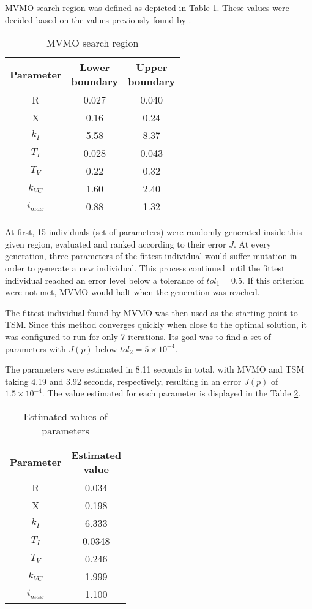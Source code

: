 MVMO search region was defined as depicted in Table \ref{tab: MVMO_boundaries}. These values were decided based on the values previously found by \cite{Cari2015}.

\begin{table}[h]
	\begin{center}
		\caption{MVMO search region}
		\begin{tabular}{c|cc}
			Parameter & \shortstack{Lower \\ boundary} & \shortstack{Upper \\ boundary} \\\hline
			R & 0.027 & 0.040 \\
			X & 0.16 & 0.24 \\
			$k_{I}$ & 5.58 & 8.37 \\
			$T_{I}$ & 0.028 & 0.043 \\
			$T_{V}$ & 0.22 & 0.32 \\
			$k_{VC}$ & 1.60 & 2.40 \\
			$i_{max}$ & 0.88 & 1.32
		\end{tabular}
	\end{center}
	\label{tab: MVMO_boundaries}
\end{table}

At first, 15 individuals (set of parameters) were randomly generated inside this given region, evaluated and ranked according to their error $J$. At every generation, three parameters of the fittest individual would suffer mutation in order to generate a new individual. This process continued until the fittest individual reached an error level below a tolerance of $tol_{1} = 0.5$. If this criterion were not met, MVMO would halt when the  generation was reached.

The fittest individual found by MVMO was then used as the starting point to TSM. Since this method converges quickly when close to the optimal solution, it was configured to run for only 7 iterations. Its goal was to find a set of parameters with $J(p)$ below $tol_{2} = 5\times10^{-4}$.

The parameters were estimated in 8.11 seconds in total, with MVMO and TSM taking 4.19 and 3.92 seconds, respectively, resulting in an error $J(p)$ of $1.5\times 10^{-4}$. The value estimated for each parameter is displayed in the Table \ref{tab: results}.

\begin{table}[h]
	\begin{center}
		\caption{Estimated values of parameters}
		\begin{tabular}{c|c}
			Parameter & \shortstack{Estimated \\ value} \\\hline
			R & 0.034 \\
			X & 0.198 \\
			$k_{I}$ & 6.333 \\
			$T_{I}$ & 0.0348 \\
			$T_{V}$ & 0.246 \\
			$k_{VC}$ & 1.999 \\
			$i_{max}$ & 1.100
		\end{tabular}
	\end{center}
	\label{tab: results}
\end{table}

